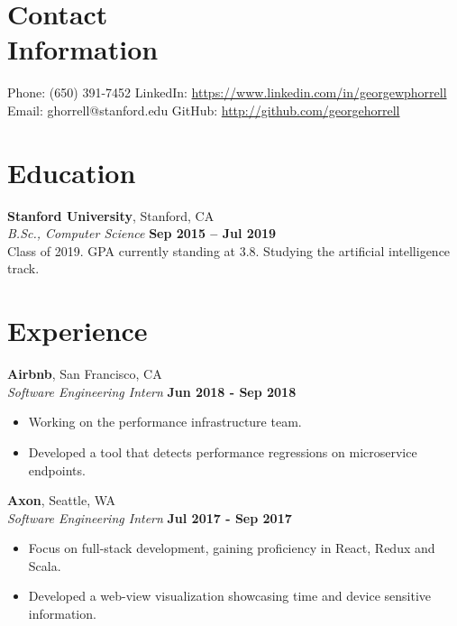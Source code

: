 \documentclass[margin,line]{resume}
\begin{document}
\begin{resume}
    \section{\mysidestyle Contact\\Information}

    Phone: (650) 391-7452       \hfill LinkedIn: \url{https://www.linkedin.com/in/georgewphorrell} \\
    \noindent Email: ghorrell@stanford.edu  \hfill GitHub: \url{http://github.com/georgehorrell} \vspace{0mm}\\\vspace{-4.5mm}

    \section{\mysidestyle Education}

    \textbf{Stanford University}, Stanford, CA \vspace{1mm}\\\vspace{1mm}%
    \textsl{B.Sc., Computer Science} \hfill \textbf{Sep 2015 -- Jul 2019}\\
    Class of 2019. GPA currently standing at 3.8. Studying the artificial intelligence track.

    \section{\mysidestyle Experience}

    \textbf{Airbnb}, San Francisco, CA \vspace{1mm}\\\vspace{1mm}%
    \textsl{Software Engineering Intern} \hfill \textbf{Jun 2018 - Sep 2018}
    \begin{itemize}
        \item Working on the performance infrastructure team.
        \item Developed a tool that detects performance regressions on microservice endpoints.
	\end{itemize}

    \textbf{Axon}, Seattle, WA \vspace{1mm}\\\vspace{1mm}%
    \textsl{Software Engineering Intern} \hfill \textbf{Jul 2017 - Sep 2017}
    \begin{itemize}
        \item Focus on full-stack development, gaining proficiency in React, Redux and Scala.
	    \item Developed a web-view visualization showcasing time and device sensitive information.
	\end{itemize}


\end{resume}
\end{document}
